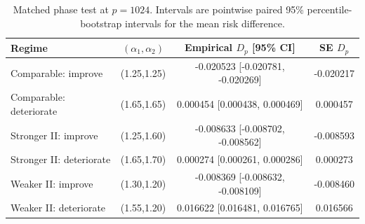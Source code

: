 \begin{table}[t]
\centering
\caption{Matched phase test at $p=1024$. Intervals are pointwise paired 95\% percentile-bootstrap intervals for the mean risk difference.}
\label{tab:matched-phase-results}
\scriptsize
\begin{tabular}{lccc}
\toprule
Regime & $(\alpha_1,\alpha_2)$ & Empirical $D_p$ [95\% CI] & SE $D_p$ \\
\midrule
Comparable: improve & (1.25,1.25) & -0.020523 [-0.020781, -0.020269] & -0.020217 \\
Comparable: deteriorate & (1.65,1.65) & 0.000454 [0.000438, 0.000469] & 0.000457 \\
Stronger II: improve & (1.25,1.60) & -0.008633 [-0.008702, -0.008562] & -0.008593 \\
Stronger II: deteriorate & (1.65,1.70) & 0.000274 [0.000261, 0.000286] & 0.000273 \\
Weaker II: improve & (1.30,1.20) & -0.008369 [-0.008632, -0.008109] & -0.008460 \\
Weaker II: deteriorate & (1.55,1.20) & 0.016622 [0.016481, 0.016765] & 0.016566 \\
\bottomrule
\end{tabular}
\end{table}
